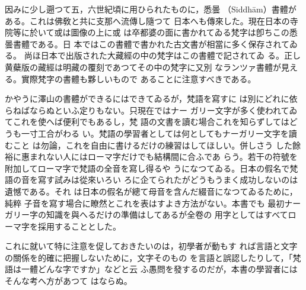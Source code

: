 \numberParagraph
因みに少し遡つて五，六世紀頃に用ひられたものに，悉曇
（Siddhām）書體がある。これは佛敎と共に支那へ流傳し隨つて
日本へも傳來した。現在日本の寺院等に於いて或は圖像の上に或
は卒都婆の面に書かれてゐる梵字は卽ちこの悉曇書體である。日
本ではこの書體で書かれた古文書が相當に多く保存されてゐる。
尚ほ日本で出版された大藏經の中の梵字はこの書體で記されてゐ
る。正し黄蘗版の藏經は明藏の覆刻であつてその中の梵字に又別
なランツァ書體が見える。實際梵字の書體も夥しいもので
あることに注意すべきである。

かやうに澤山の書體ができるにはできてゐるが，梵語を寫すに
は別にどれに依らねばならぬといふ定りもない。只現在ではナー
ガリー文字が多く使われてゐてこれを使へば便利でもあるし，梵
語の文書を讀む場合これを知らずしてはどうも一寸工合がわる
い。梵語の學習者としては何としてもナーガリー文字を讀むこと
は勿論，これを自由に書けるだけの練習はしてほしい。併しさう
した餘裕に惠まれない人にはローマ字だけでも結構間に合ふであ
らう。若干の符號を附加してローマ字で梵語の全音を寫し得るや
うになつてゐる。日本の假名で梵語の音を寫す試みは從來いろい
ろに企てられたがどうもうまく成功しないのは遺憾である。それ
は日本の假名が總て母音を含んだ綴音になつてゐるために，純粹
子音を寫す場合に瞭然とこれを表はすよき方法がない。本書でも
最初ナーガリー字の知識を與へるだけの準備はしてあるが全卷の
用字としてはすべてローマ字を採用することとした。

これに就いて特に注意を促しておきたいのは，初學者が動もす
れば言語と文字の關係を的確に把握しないために，文字そのもの
を言語と誤認したりして，「梵語は一體どんな字ですか」などと云
ふ愚問を發するのだが，本書の學習者にはそんな考へ方があつて
はならぬ。

